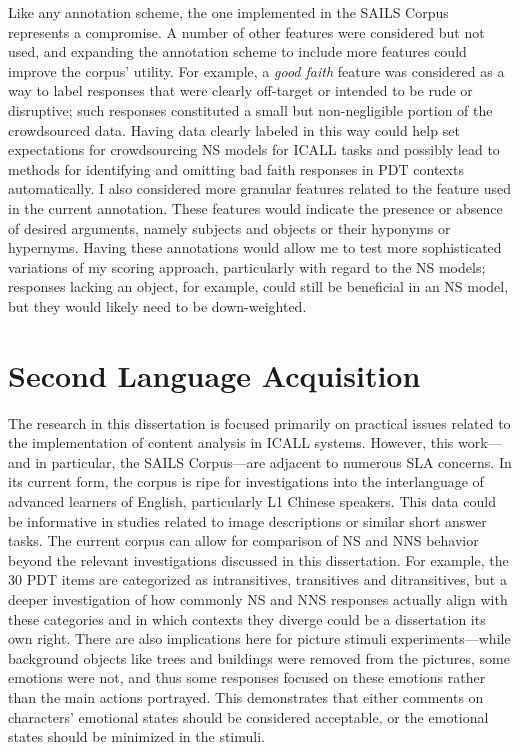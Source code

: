 Like any annotation scheme, the one implemented in the SAILS Corpus represents a compromise. A number of other features were considered but not used, and expanding the annotation scheme to include more features could improve the corpus' utility. For example, a \textit{good faith} feature was considered as a way to label responses that were clearly off-target or intended to be rude or disruptive; such responses constituted a small but non-negligible portion of the crowdsourced data. Having data clearly labeled in this way could help set expectations for crowdsourcing NS models for ICALL tasks and possibly lead to methods for identifying and omitting bad faith responses in PDT contexts automatically. I also considered more granular features related to the  feature used in the current annotation. These features would indicate the presence or absence of desired arguments, namely subjects and objects or their hyponyms or hypernyms. Having these annotations would allow me to test more sophisticated variations of my scoring approach, particularly with regard to the NS models; responses lacking an object, for example, could still be beneficial in an NS model, but they would likely need to be down-weighted.

\section{Second Language Acquisition}
\label{sec:outlook-sla}

The research in this dissertation is focused primarily on practical issues related to the implementation of content analysis in ICALL systems. However, this work---and in particular, the SAILS Corpus---are adjacent to numerous SLA concerns. In its current form, the corpus is ripe for investigations into the interlanguage of advanced learners of English, particularly L1 Chinese speakers. This data could be informative in studies related to image descriptions or similar short answer tasks. The current corpus can allow for comparison of NS and NNS behavior beyond the relevant investigations discussed in this dissertation. For example, the 30 PDT items are categorized as intransitives, transitives and ditransitives, but a deeper investigation of how commonly NS and NNS responses actually align with these categories and in which contexts they diverge could be a dissertation its own right. There are also implications here for picture stimuli experiments---while background objects like trees and buildings were removed from the pictures, some emotions were not, and thus some responses focused on these emotions rather than the main actions portrayed. This demonstrates that either comments on characters' emotional states should be considered acceptable, or the emotional states should be minimized in the stimuli.

